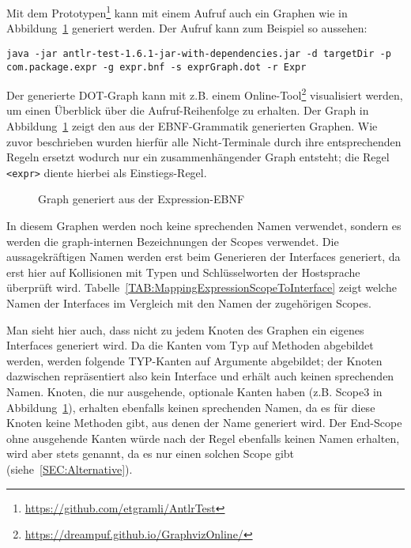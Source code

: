 \documentclass[../InterneDSLs.tex]{subfiles}
\begin{document}
Mit dem Prototypen\footnote{\url{https://github.com/etgramli/AntlrTest}} kann mit einem Aufruf auch ein Graphen wie in Abbildung~\ref{FIG:ExprGraph} generiert werden. Der Aufruf kann zum Beispiel so aussehen:
\begin{lstlisting}
java -jar antlr-test-1.6.1-jar-with-dependencies.jar -d targetDir -p com.package.expr -g expr.bnf -s exprGraph.dot -r Expr
\end{lstlisting}

\begin{figure}

\end{figure}

Der generierte DOT-Graph kann mit z.B. einem Online-Tool\footnote{\url{https://dreampuf.github.io/GraphvizOnline/}} visualisiert werden, um einen Überblick über die Aufruf-Reihenfolge zu erhalten. Der Graph in Abbildung~\ref{FIG:ExprGraph} zeigt den aus der EBNF-Grammatik generierten Graphen. Wie zuvor beschrieben wurden hierfür alle Nicht-Terminale durch ihre entsprechenden Regeln ersetzt wodurch nur ein zusammenhängender Graph entsteht; die Regel \verb|<expr>| diente hierbei als Einstiegs-Regel.

\begin{figure}[ht]
\centering
\resizebox{\linewidth}{!}{}
\caption{Graph generiert aus der Expression-EBNF}
\label{FIG:ExprGraph}
\end{figure}

In diesem Graphen werden noch keine sprechenden Namen verwendet, sondern es werden die graph-internen Bezeichnungen der Scopes verwendet. Die aussagekräftigen Namen werden erst beim Generieren der Interfaces generiert, da erst hier auf Kollisionen mit Typen und Schlüsselworten der Hostsprache überprüft wird. Tabelle~\ref{TAB:MappingExpressionScopeToInterface} zeigt welche Namen der Interfaces im Vergleich mit den Namen der zugehörigen Scopes.

Man sieht hier auch, dass nicht zu jedem Knoten des Graphen ein eigenes Interfaces generiert wird. Da die Kanten vom Typ  auf Methoden abgebildet werden, werden folgende TYP-Kanten auf Argumente abgebildet; der Knoten dazwischen repräsentiert also kein Interface und erhält auch keinen sprechenden Namen. Knoten, die nur ausgehende, optionale Kanten haben (z.B. Scope3 in Abbildung~\ref{FIG:ExprGraph}), erhalten ebenfalls keinen sprechenden Namen, da es für diese Knoten keine Methoden gibt, aus denen der Name generiert wird. Der End-Scope ohne ausgehende Kanten würde nach der Regel ebenfalls keinen Namen erhalten, wird aber stets  genannt, da es nur einen solchen Scope gibt (siehe~\ref{SEC:Alternative}).
\end{document}
